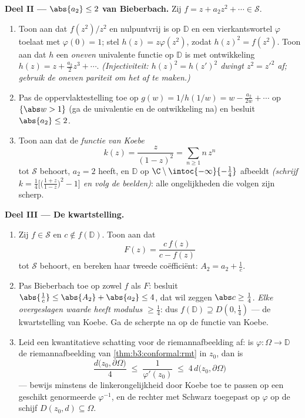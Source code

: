\begin{problem}
\medskip
\noindent\textbf{Deel II --- $\abs{a_2} \leq 2$ van Bieberbach.}
Zij $f = z + a_2z^2 + \cdots \in \mathcal S$.
\begin{enumerate}[resume]
  \item Toon aan dat $f(z^2)/z^2$  en nulpuntvrij is op
        $\mathbb D$ en een  vierkantswortel $\varphi$
        toelaat met $\varphi(0) = 1$; stel $h(z) =
        z\varphi(z^2)$, zodat $h(z)^2 = f(z^2)$. Toon aan dat $h$
        een \emph{oneven} univalente functie op $\mathbb D$ is
        met ontwikkeling $h(z) = z + \frac{a_2}2z^3 + \cdots$.
        \emph{(Injectiviteit: $h(z)^2 = h(z')^2$ dwingt $z^2 =
        z'^2$ af; gebruik de oneven pariteit om het af te
        maken.)}
  \item Pas de oppervlaktestelling toe op $g(w) = 1/h(1/w) = w -
        \frac{a_2}{2w} + \cdots$ op $\{\abs w > 1\}$ (ga de
        univalentie en de ontwikkeling na) en besluit $\abs{a_2}
        \leq 2$.
  \item Toon aan dat de \emph{functie van Koebe}
        \[
        k(z) = \frac{z}{(1 - z)^2} = \sum_{n\geq1}n\,z^n
        \]
        tot $\mathcal S$ behoort, $a_2 = 2$ heeft, en $\mathbb D$
        op $\C\setminus\intoc{-\infty}{-\frac14}$ afbeeldt
        \emph{(schrijf $k = \frac14\bigl[\bigl(\frac{1+z}{1 -
        z}\bigr)^2 - 1\bigr]$ en volg de beelden)}: alle
        ongelijkheden die volgen zijn scherp.
\end{enumerate}

\medskip
\noindent\textbf{Deel III --- De kwartstelling.}
\begin{enumerate}[resume]
  \item Zij $f \in \mathcal S$ en $c \notin f(\mathbb D)$. Toon
        aan dat
        \[
        F(z) = \frac{c\,f(z)}{c - f(z)}
        \]
        tot $\mathcal S$ behoort, en bereken haar tweede
        coëfficiënt: $A_2 = a_2 + \frac1c$.
  \item Pas Bieberbach toe op zowel $f$ als $F$: besluit
        $\abs{\frac1c} \leq \abs{A_2} + \abs{a_2} \leq 4$, dat
        wil zeggen $\abs c \geq \frac14$. \emph{Elke overgeslagen
        waarde heeft modulus $\geq \frac14$}: dus $f(\mathbb D)
        \supseteq D(0, \frac14)$ --- de kwartstelling van Koebe.
        Ga de scherpte na op de functie van Koebe.
  \item Leid een kwantitatieve schatting voor de
        riemannafbeelding af: is $\varphi \colon \Omega \to
        \mathbb D$ de riemannafbeelding van
        \cref{thm:b3:conformal:rmt} in $z_0$, dan is
        \[
        \frac{d\bigl(z_0, \partial\Omega\bigr)}{4}
        \;\leq\; \frac1{\varphi'(z_0)} \;\leq\;
        4\,d\bigl(z_0, \partial\Omega\bigr)
        \]
        --- bewijs minstens de linkerongelijkheid door Koebe toe
        te passen op een geschikt genormeerde $\varphi^{-1}$, en
        de rechter met Schwarz toegepast op $\varphi$ op de
        schijf $D(z_0, d) \subseteq \Omega$.
\end{enumerate}


\end{problem}
